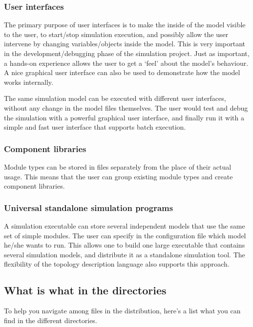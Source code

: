 \subsubsection{User interfaces}

The primary purpose of user interfaces is to make the inside
of the model visible to the user, to start/stop simulation execution,
and possibly allow the user intervene by changing variables/objects
inside the model. This is very important in the development/debugging
phase of the simulation project. Just as important, a hands-on
experience allows the user to get a `feel' about the model's
behaviour. A nice graphical user interface can also be used to
demonstrate how the model works internally.


The same simulation model can be executed with different user
interfaces, without any change in the model files themselves.
The user would test and debug the simulation with a powerful
graphical user interface, and finally run it with a simple and
fast user interface that supports batch execution.


\subsubsection{Component libraries}

Module types can be stored in files separately from the place
of their actual usage. This means that the user can group existing
module types and create component libraries.


\subsubsection{Universal standalone simulation programs}


A simulation executable can store several independent models
that use the same set of simple modules. The user can specify
in the configuration file which model he/she wants to run. This
allows one to build one large executable that contains several
simulation models, and distribute it as a standalone simulation
tool. The flexibility of the topology description language also
supports this approach.


\subsection{What is what in the directories}

To help you navigate among files in the {\opp} distribution,
here's a list what you can find in the different directories.

